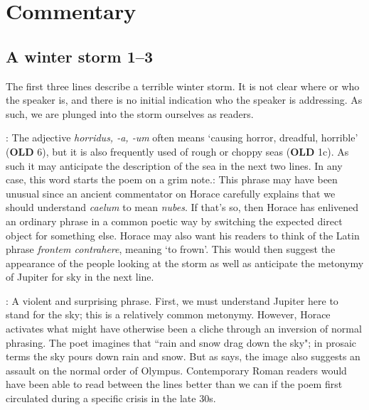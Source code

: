 \chapter*{Commentary}

\section*{A winter storm 1--3}

The first three lines describe a terrible winter storm.  It is not clear where or who the speaker is, and there is no initial indication who the speaker is addressing.  As such, we are plunged into the storm ourselves as readers.


: The adjective \textit{horridus, -a, -um} often means `causing horror, dreadful, horrible' (\textbf{OLD} 6), but it is also frequently used of rough or choppy seas (\textbf{OLD} 1c).  As such it may anticipate the description of the sea in the next two lines.  In any case, this word starts the poem on a grim note.\indent{}: This phrase may have been unusual since an ancient commentator on Horace carefully explains that we should understand \textit{caelum} to mean \textit{nubes}.  If that's so, then Horace has enlivened an ordinary phrase in a common poetic way by switching the expected direct object for something else.  Horace may also want his readers to think of the Latin phrase \textit{frontem contrahere}, meaning `to frown'.  This would then suggest the appearance of the people looking at the storm as well as anticipate the metonymy of Jupiter for sky in the next line.  


: A violent and surprising phrase.  First, we must understand Jupiter here to stand for the sky; this is a relatively common metonymy.  However, Horace activates what might have otherwise been a cliche through an inversion of normal phrasing.  The poet imagines that  ``rain and snow drag down the sky"; in prosaic terms the sky pours down rain and snow.  But as \citet[215]{mankin1995} says, the image also suggests an assault on the normal order of Olympus.  Contemporary Roman readers would have been able to read between the lines better than we can if the poem first circulated during a specific crisis in the late 30s.


